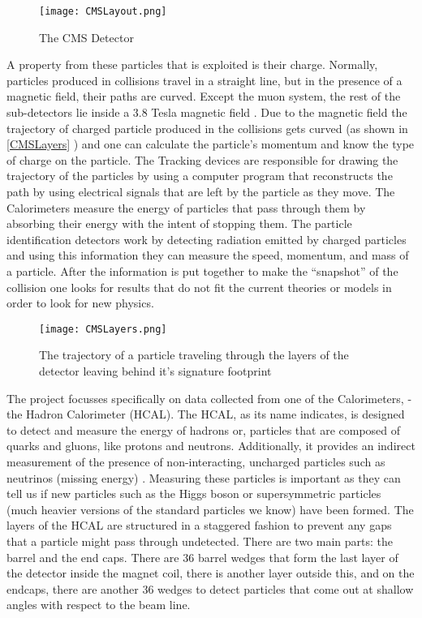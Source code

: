 \begin{figure}
	\texttt{[image: CMSLayout.png]}
	\caption{The CMS Detector \label{CMSLayout}}
\end{figure}

A property from these particles that is exploited is their charge. Normally, particles produced in collisions travel in a straight line, but in the presence of a magnetic field, their paths are curved. Except the muon system, the rest of the sub-detectors lie inside a 3.8 Tesla magnetic field . Due to the magnetic field the trajectory of charged particle produced in the collisions gets curved  (as shown in \autoref{CMSLayers} ) and one can calculate the particle's momentum and know the type of charge on the particle.
The Tracking devices are responsible for drawing the trajectory of the particles by using a computer program that reconstructs the path by using electrical signals that are left by the particle as they move.
The Calorimeters measure the energy of particles that pass through them by absorbing their energy with the intent of stopping them. The particle identification detectors work by detecting radiation emitted by charged particles and using this information they can measure the speed, momentum, and mass of a particle. After the information is put together to make the “snapshot” of the collision one looks for results that do not fit the current theories or models in order to look for new physics. \cite{CMS_detector}


\begin{figure}
	\texttt{[image: CMSLayers.png]}
	\caption{The trajectory of a particle traveling through the layers of the detector leaving behind it's signature footprint\label{CMSLayers}}
\end{figure}


The project focusses specifically on data collected from one of the Calorimeters, - the Hadron Calorimeter (HCAL). The HCAL, as its name indicates, is designed to detect and measure the energy of hadrons or, particles that are composed of quarks and gluons, like protons and neutrons. Additionally, it provides an indirect measurement of the presence of non-interacting, uncharged particles such as neutrinos (missing energy) . Measuring these particles is important as they can tell us if new particles such as the Higgs boson or supersymmetric particles (much heavier versions of the standard particles we know) have been formed. The layers of the HCAL are structured in a staggered fashion to prevent any gaps that a particle might pass through undetected. There are two main parts: the barrel and the end caps. There are 36 barrel wedges that form the last layer of the detector inside the magnet coil, there is another layer outside this, and on the endcaps, there are another 36 wedges to detect particles that come out at shallow angles with respect to the beam line.
